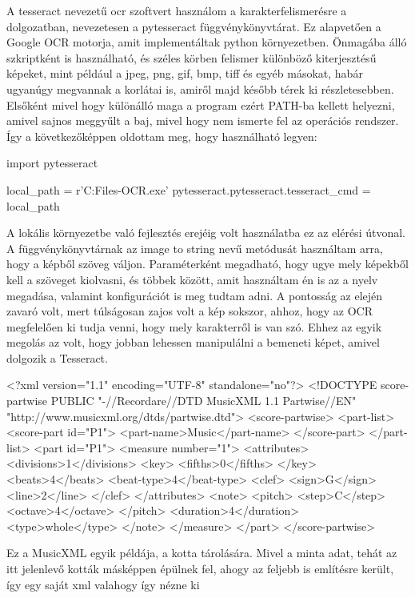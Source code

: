 A tesseract nevezetű ocr szoftvert használom a karakterfelismerésre a dolgozatban, nevezetesen a pytesseract függvénykönyvtárat. Ez alapvetően a Google OCR motorja, amit implementáltak python környezetben. Önmagába álló szkriptként is használható, és széles körben felismer különböző kiterjesztésű képeket, mint például a jpeg, png, gif, bmp, tiff és egyéb másokat, habár ugyanúgy megvannak a korlátai is, amiről majd később térek ki részletesebben. Elsőként mivel hogy különálló maga a program ezért PATH-ba kellett helyezni, amivel sajnos meggyűlt a baj, mivel hogy nem ismerte fel az operációs rendszer. Így a következőképpen oldottam meg, hogy használható legyen:
\begin{python}
import pytesseract
	
local_path =  r'C:\Program Files\Tesseract-OCR\tesseract.exe'
pytesseract.pytesseract.tesseract_cmd = local_path
\end{python}
A lokális környezetbe való fejlesztés erejéig volt használatba ez az elérési útvonal. A függvénykönyvtárnak az image to string nevű metódusát használtam arra, hogy a képből szöveg váljon. Paraméterként megadható, hogy ugye mely képekből kell a szöveget kiolvasni, és többek között, amit használtam én is az a nyelv megadása, valamint konfigurációt is meg tudtam adni. A pontosság az elején zavaró volt, mert túlságosan zajos volt a kép sokszor, ahhoz, hogy az OCR megfelelően ki tudja venni, hogy mely karakterről is van szó. Ehhez az egyik megolás az volt, hogy jobban lehessen manipulálni a bemeneti képet, amivel dolgozik a Tesseract.
\newpage
{}
\begin{xml}
	<?xml version="1.1" encoding="UTF-8" standalone="no"?>
	<!DOCTYPE score-partwise PUBLIC
	"-//Recordare//DTD MusicXML 1.1 Partwise//EN"
	"http://www.musicxml.org/dtds/partwise.dtd">
	<score-partwise>
	<part-list>
	<score-part id="P1">
	<part-name>Music</part-name>
	</score-part>
	</part-list>
	<part id="P1">
	<measure number="1">
	<attributes>
	<divisions>1</divisions>
	<key>
	<fifths>0</fifths>
	</key>
	<beats>4</beats>
	<beat-type>4</beat-type>
	<clef>
	<sign>G</sign>
	<line>2</line>
	</clef>
	</attributes>
	<note>
	<pitch>
	<step>C</step>
	<octave>4</octave>
	</pitch>
	<duration>4</duration>
	<type>whole</type>
	</note>
	</measure>
	</part>
	</score-partwise>
\end{xml}

Ez a MusicXML egyik példája, a kotta tárolására. Mivel a minta adat, tehát az itt jelenlevő kották másképpen épülnek fel, ahogy az feljebb is említésre került, így egy saját xml valahogy így nézne ki

